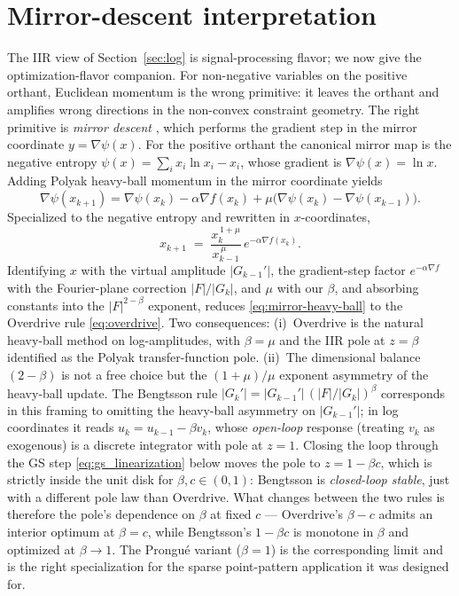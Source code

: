 \documentclass[11pt,a4paper]{article}
\begin{document}
\section{Mirror-descent interpretation}\label{sec:mirror}

The IIR view of Section~\ref{sec:log} is signal-processing flavor; we
now give the optimization-flavor companion. For non-negative variables on
the positive orthant, Euclidean momentum is the wrong primitive: it leaves
the orthant and amplifies wrong directions in the non-convex constraint
geometry. The right primitive is \emph{mirror descent} \cite{Beck2003,
Bubeck2015}, which performs the gradient step in the mirror coordinate
$y=\nabla\psi(x)$. For the positive orthant the canonical mirror map is
the negative entropy $\psi(x)=\sum_i x_i\ln x_i - x_i$, whose gradient is
$\nabla\psi(x)=\ln x$. Adding Polyak heavy-ball momentum in the mirror
coordinate yields
\begin{equation}
  \nabla\psi(x_{k+1}) = \nabla\psi(x_k) - \alpha\nabla f(x_k)
                          + \mu\bigl(\nabla\psi(x_k)-\nabla\psi(x_{k-1})\bigr).
\end{equation}
Specialized to the negative entropy and rewritten in $x$-coordinates,
\begin{equation}
  x_{k+1} \;=\; \frac{x_k^{\,1+\mu}}{x_{k-1}^{\,\mu}}\,e^{-\alpha\nabla f(x_k)}.
  \label{eq:mirror-heavy-ball}
\end{equation}
Identifying $x$ with the virtual amplitude $|G_{k-1}'|$, the
gradient-step factor $e^{-\alpha\nabla f}$ with the Fourier-plane
correction $|F|/|G_k|$, and $\mu$ with our $\beta$, and absorbing
constants into the $|F|^{2-\beta}$ exponent, reduces
\eqref{eq:mirror-heavy-ball} to the Overdrive rule \eqref{eq:overdrive}.
Two consequences: (i)~Overdrive is the natural heavy-ball method on
log-amplitudes, with $\beta=\mu$ and the IIR pole at $z=\beta$ identified
as the Polyak transfer-function pole. (ii)~The dimensional balance
$(2-\beta)$ is not a free choice but the $(1+\mu)/\mu$ exponent asymmetry
of the heavy-ball update.
The Bengtsson rule $|G_k'| = |G_{k-1}'|\,(|F|/|G_k|)^\beta$ corresponds in
this framing to omitting the heavy-ball asymmetry on $|G_{k-1}'|$; in log
coordinates it reads $u_k = u_{k-1} - \beta v_k$, whose
\emph{open-loop} response (treating $v_k$ as exogenous) is a discrete
integrator with pole at $z=1$. Closing the loop through the GS step
\eqref{eq:gs_linearization} below moves the pole to $z=1-\beta c$, which
is strictly inside the unit disk for $\beta,c\in(0,1)$: Bengtsson is
\emph{closed-loop stable}, just with a different pole law than Overdrive.
What changes between the two rules is therefore the pole's dependence on
$\beta$ at fixed $c$ --- Overdrive's $\beta-c$ admits an interior optimum
at $\beta=c$, while Bengtsson's $1-\beta c$ is monotone in $\beta$ and
optimized at $\beta\to 1$. The Prongu\'e variant ($\beta=1$) is the
corresponding limit and is the right specialization for the sparse
point-pattern application it was designed for.
\end{document}

